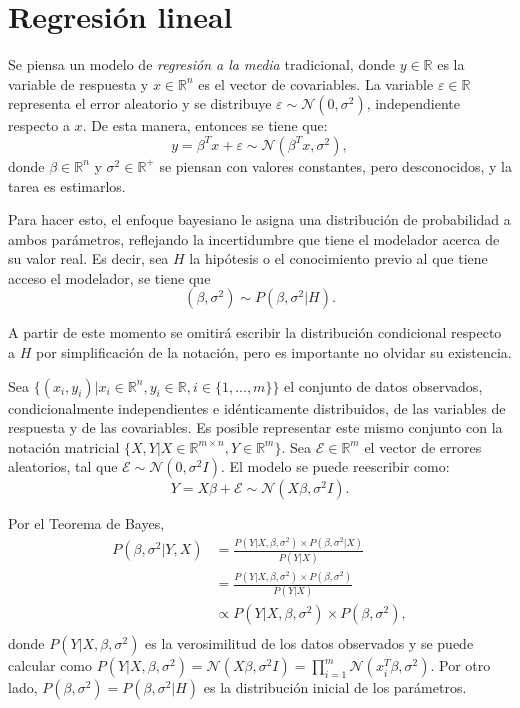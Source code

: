 \section{Regresión lineal}

Se piensa un modelo de \textit{regresión a la media} tradicional, donde $y \in \mathbb{R}$ es la variable de respuesta y $x \in \mathbb{R}^n$ es el vector de covariables. La variable $\varepsilon \in \mathbb{R}$ representa el error aleatorio y se distribuye $\varepsilon \sim \mathcal{N}(0,\sigma^2)$, independiente respecto a $x$. De esta manera, entonces se tiene que:
\begin{equation*}
    y = \beta^Tx + \varepsilon \sim \mathcal{N}(\beta^T x,\sigma^2),
\end{equation*}
donde $\beta \in \mathbb{R}^n$ y $\sigma^2 \in \mathbb{R}^+$ se piensan con valores constantes, pero desconocidos, y la tarea es estimarlos.

Para hacer esto, el enfoque bayesiano le asigna una distribución de probabilidad a ambos par\'ametros, reflejando la incertidumbre que tiene el modelador acerca de su valor real. Es decir, sea $H$ la hip\'otesis o el conocimiento previo al que tiene acceso el modelador, se tiene que 
\begin{equation*}
    (\beta,\sigma^2) \sim P(\beta,\sigma^2|H).
\end{equation*}

A partir de este momento se omitir\'a escribir la distribuci\'on condicional respecto a $H$ por simplificaci\'on de la notaci\'on, pero es importante no olvidar su existencia.

Sea $\{(x_i,y_i)| x_i \in \mathbb{R}^n, y_i \in \mathbb{R}, i \in \{1,...,m\} \}$ el conjunto de datos observados, condicionalmente independientes e id\'enticamente distribuidos, de las variables de respuesta y de las covariables. Es posible representar este mismo conjunto con la notaci\'on matricial $\{X,Y | X \in \mathbb{R}^{m \times n}, Y \in \mathbb{R}^m\}$. Sea $\mathcal{E} \in \mathbb{R}^m$ el vector de errores aleatorios, tal que $\mathcal{E} \sim \mathcal{N}(0,\sigma^2 I)$. El modelo se puede reescribir como:
\begin{equation*}
    Y = X\beta + \mathcal{E} \sim \mathcal{N}(X\beta,\sigma^2 I).
\end{equation*}

Por el Teorema de Bayes,
\begin{equation*}
\begin{aligned}
    P(\beta,\sigma^2 | Y, X) 
    &= \frac{P(Y| X, \beta, \sigma^2) \times P(\beta, \sigma^2 | X)}{P(Y | X)} \\
    &= \frac{P(Y| X, \beta, \sigma^2) \times P(\beta, \sigma^2)}{P(Y | X)} \\
    &\propto P(Y| X, \beta, \sigma^2) \times P(\beta, \sigma^2), \\
\end{aligned}
\end{equation*}
donde $P(Y| X, \beta, \sigma^2)$ es la verosimilitud de los datos observados y se puede calcular como $P(Y| X, \beta, \sigma^2) = \mathcal{N}(X\beta,\sigma^2 I) = \prod_{i=1}^m \mathcal{N}(x_i^T\beta,\sigma^2)$. Por otro lado, $P(\beta,\sigma^2) = P(\beta,\sigma^2|H)$ es la distribuci\'on inicial de los par\'ametros.

